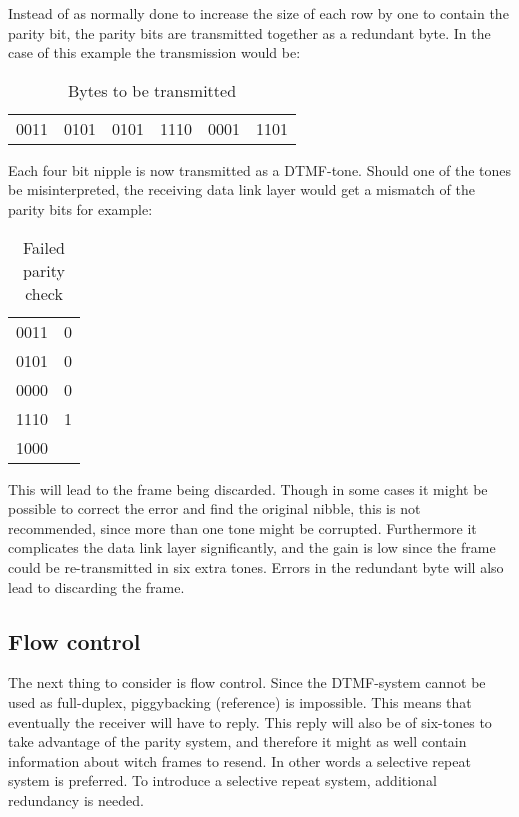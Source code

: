 Instead of as normally done to increase the size of each row by one to contain
the parity bit, the parity bits are transmitted together as a redundant byte. In
the case of this example the transmission would be:

\begin{table}[htb]
	\begin{center}
	\begin{tabular}{c|c|c|c|c|c}
	0011 & 0101 & 0101 & 1110 & 0001 & 1101 \\
	\end{tabular}
	\end{center}
	\caption{Bytes to be transmitted}
	\label{tab:bytes_to_be_transmitted}
\end{table}

Each four bit nipple is now transmitted as a DTMF-tone. Should one of the tones
be misinterpreted, the receiving data link layer would get a mismatch of the
parity bits for example:

\begin{table}[htb]
	\begin{center}
	\begin{tabular}{c|c}
	0011 & 0 \\
	0101 & 0 \\
	0000 & 0 \\
	1110 & 1 \\
	\hline
	1000 & \\
	\end{tabular}
	\end{center}
	\caption{Failed parity check}
	\label{tab:failed_parity_check}
\end{table}

This will lead to the frame being discarded. Though in some cases it might be
possible to correct the error and find the original nibble, this is not
recommended, since more than one tone might be corrupted. Furthermore it
complicates the data link layer significantly, and the gain is low since the
frame could be re-transmitted in six extra tones. Errors in the redundant byte
will also lead to discarding the frame.

\subsection{Flow control}
The next thing to consider is flow control. Since the DTMF-system
cannot be used as full-duplex, piggybacking (reference) is impossible. This
means that eventually the receiver will have to reply. This reply will also
be of six-tones to take advantage of the parity system, and therefore it might
as well contain information about witch frames to resend. In other words a
selective repeat system is preferred. To introduce a selective repeat system,
additional redundancy is needed.

